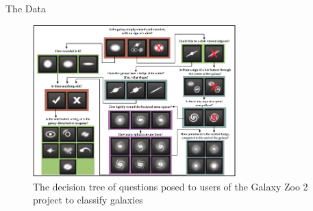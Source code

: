 \documentclass{beamer}
\begin{document}
\begin{frame}{The Data}

    \begin{figure}
        \centering
        \includegraphics[width=0.7\textwidth]{Figures/GZ_Decison_Tree.png}
        \caption{The decision tree of questions posed to users of the Galaxy Zoo 2 project to classify galaxies }
        \label{fig:gztree}
    \end{figure}

\end{frame}
\end{document}
